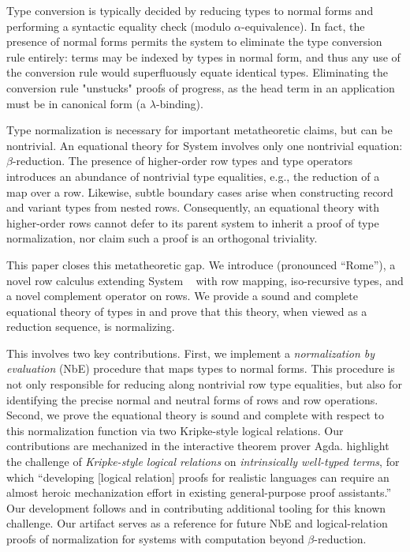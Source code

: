 Type conversion is typically decided by reducing types to normal forms and performing a syntactic equality check (modulo $\alpha$-equivalence). In fact, the presence of normal forms permits the system to eliminate the type conversion rule entirely: terms may be indexed by types in normal form, and thus any use of the conversion rule would superfluously equate identical types. Eliminating the conversion rule "unstucks" proofs of progress, as the head term in an application must be in canonical form (a $\lambda$-binding).

Type normalization is necessary for important metatheoretic claims, but can be nontrivial. An equational theory for System \FO involves only one nontrivial equation: $\beta$-reduction. The presence of higher-order row types and type operators introduces an abundance of nontrivial type equalities, e.g., the reduction of a map over a row. Likewise, subtle boundary cases arise when constructing record and variant types from nested rows. Consequently, an equational theory with higher-order rows cannot defer to its parent system to inherit a proof of type normalization, nor claim such a proof is an orthogonal triviality. 

This paper closes this metatheoretic gap. We introduce \Rome{} (pronounced ``Rome''), a novel row calculus extending System \RO~\citep{HubersM23} with row mapping, iso-recursive types, and a novel complement operator on rows. We provide a sound and complete equational theory of types in \Rome{} and prove that this theory, when viewed as a reduction sequence, is normalizing.

This involves two key contributions. First, we implement a \emph{normalization by evaluation} (NbE) procedure that maps types to normal forms. This procedure is not only responsible for reducing along nontrivial row type equalities, but also for identifying the precise normal and neutral forms of rows and row operations. Second, we prove the equational theory is sound and complete with respect to this normalization function via two Kripke-style logical relations. Our contributions are mechanized in the interactive theorem prover Agda.  highlight the challenge of \emph{Kripke-style logical relations} on \emph{intrinsically well-typed terms}, for which ``developing [logical relation] proofs for realistic languages can require an almost heroic mechanization effort in existing general-purpose proof assistants.'' Our development follows \citet{AllaisBM13} and \citet{ChapmanKNW19} in contributing additional tooling for this known challenge. Our artifact serves as a reference for future NbE and logical-relation proofs of normalization for systems with computation beyond $\beta$-reduction.

